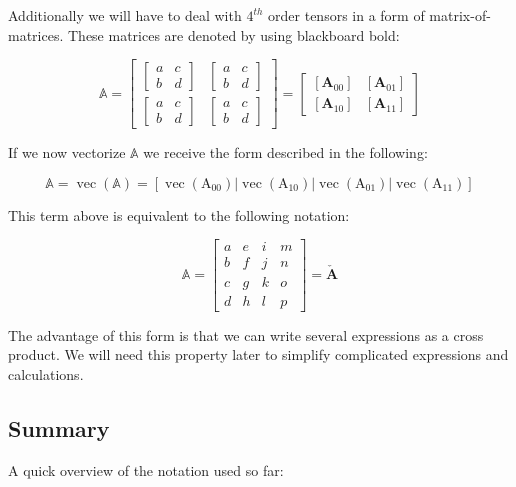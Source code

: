 Additionally we will have to deal with $4^{th}$ order tensors in a form of matrix-of-matrices. These matrices are denoted by using blackboard bold:

\[
\mathbb{A} = 
\left[\begin{array}{cc}{\begin{bmatrix} a & c \\ b & d \end{bmatrix}} & {\begin{bmatrix} a & c \\ b & d \end{bmatrix}} \\ {\begin{bmatrix} a & c \\ b & d \end{bmatrix}} & {\begin{bmatrix} a & c \\ b & d \end{bmatrix}}\end{array}\right]
=
\left[\begin{array}{cc}{\left[\mathbf{A}_{00}\right]} & {\left[\mathbf{A}_{01}\right]} \\ {\left[\mathbf{A}_{10}\right]} & {\left[\mathbf{A}_{11}\right]}\end{array}\right]
\]

If we now vectorize $\mathbb{A}$ we receive the form described in the following:

\[
\mathbb{A} = \operatorname{vec}(\mathbb{A})=\left[\operatorname{vec}\left(\mathrm{A}_{00}\right)\left|\operatorname{vec}\left(\mathrm{A}_{10}\right)\right| \operatorname{vec}\left(\mathrm{A}_{01}\right) | \operatorname{vec}\left(\mathrm{A}_{11}\right)\right]
\]

This term above is equivalent to the following notation:

\[
\mathbb{A}=\left[\begin{array}{llll}{a} & {e} & {i} & {m} \\ {b} & {f} & {j} & {n} \\ {c} & {g} & {k} & {o} \\ {d} & {h} & {l} & {p}\end{array}\right] 
=\boldsymbol{\check{A}}
\]

The advantage of this form is that we can write several expressions as a cross product. We will need this property later to simplify complicated expressions and calculations.


\subsection{Summary}
A quick overview of the notation used so far:

